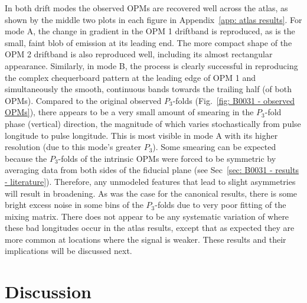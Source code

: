 In both drift modes the observed OPMs are recovered well across the atlas, as shown by the middle two plots in each figure in Appendix~\ref{app: atlas results}. For mode A, the change in gradient in the OPM 1 driftband is reproduced, as is the small, faint blob of emission at its leading end. The more compact shape of the OPM 2 driftband is also reproduced well, including its almost rectangular appearance. Similarly, in mode B, the process is clearly successful in reproducing the complex chequerboard pattern at the leading edge of OPM 1 and simultaneously the smooth, continuous bands towards the trailing half (of both OPMs). Compared to the original observed $P_3$-folds (Fig.~\ref{fig: B0031 - observed OPMs}), there appears to be a very small amount of smearing in the $P_3$-fold phase (vertical) direction, the magnitude of which varies stochastically from pulse longitude to pulse longitude. This is most visible in mode A with its higher resolution (due to this mode's greater $P_3$). Some smearing can be expected because the $P_3$-folds of the intrinsic OPMs were forced to be symmetric by averaging data from both sides of the fiducial plane (see Sec~\ref{sec: B0031 - results - literature}). Therefore, any unmodeled features that lead to slight asymmetries will result in broadening. As was the case for the canonical results, there is some bright excess noise in some bins of the $P_3$-folds due to very poor fitting of the mixing matrix. There does not appear to be any systematic variation of where these bad longitudes occur in the atlas results, except that as expected they are more common at locations where the signal is weaker. These results and their implications will be discussed next.


















\section{Discussion}
\label{sec: B0031 - discussion}

